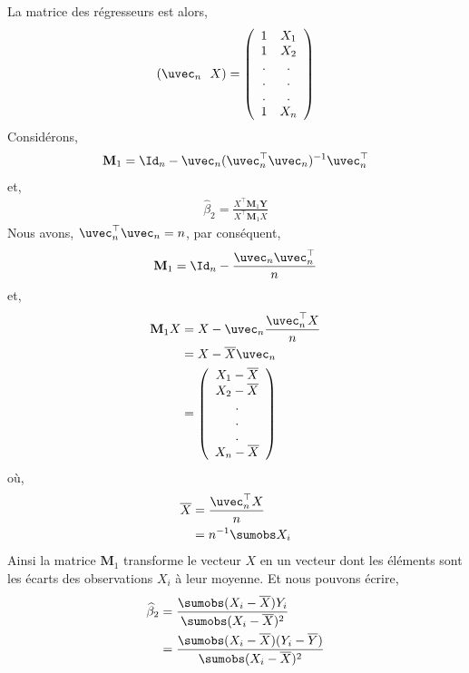 La matrice des régresseurs est alors,
\begin{align*}
 \left(\uvec_n \ \ X\right) = 
\left(
\begin{array}{cc}
1&X_1\\
1&X_2\\
.&.\\
.&.\\
.&.\\
1&X_n
\end{array}
\right)
\end{align*}
Considérons,
\begin{align*}
\mathbf{M}_1 = \Id_n - \uvec_n(\uvec_n^\top\uvec_n)^{-1}\uvec_n^\top
\end{align*}
et,
\begin{align*}
\widehat{\beta}_2 = \frac{X^\top\mathbf{M}_1\mathbf{Y}}{X^\top\mathbf{M}_1X}
\end{align*}
Nous avons, $\uvec_n^\top\uvec_n = n$, par conséquent,
\begin{align*}
\mathbf{M}_1 = \Id_n - \frac{\uvec_n\uvec_n^\top}{n}
\end{align*}
et,
\begin{align*}
\mathbf{M}_1X &= X - \uvec_n\frac{\uvec_n^\top X}{n}\\
& = X - \overline{X}\uvec_n\\
& = 
\left(
\begin{array}{c}
X_1 - \overline{X}\\
X_2 - \overline{X}\\
.\\
.\\
.\\
X_n - \overline{X}
\end{array}
\right)
\end{align*}
où,
\begin{align*}
\overline{X} &= \frac{\uvec_n^\top X}{n}\\
&=n^{-1}\sumobs X_i
\end{align*}
Ainsi la matrice $\mathbf{M}_1$ transforme le vecteur $X$ en un vecteur dont les éléments sont les écarts des observations $X_i$ à leur moyenne. Et nous pouvons écrire,
\begin{align*}
\widehat{\beta}_2 &= \frac{\sumobs(X_i - \overline{X})Y_i}{\sumobs(X_i - \overline{X}) ^2}\\
&= \frac{\sumobs(X_i - \overline{X})(Y_i - \overline{Y})}{\sumobs(X_i - \overline{X}) ^2}
\end{align*}

